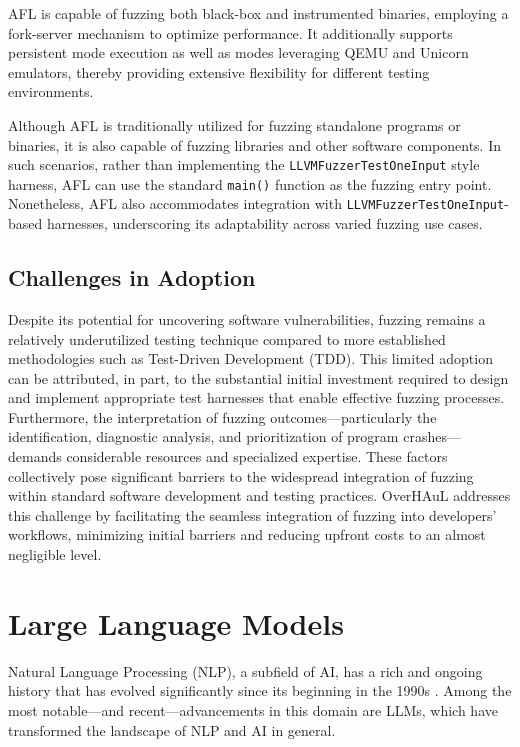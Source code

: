 \documentclass[
  a4paper,
]{scrreprt}
\theoremstyle{definition}
\theoremstyle{remark}
\begin{document}
AFL is capable of fuzzing both black-box and instrumented binaries,
employing a fork-server mechanism to optimize performance. It
additionally supports persistent mode execution as well as modes
leveraging QEMU and Unicorn emulators, thereby providing extensive
flexibility for different testing environments.

Although AFL is traditionally utilized for fuzzing standalone programs
or binaries, it is also capable of fuzzing libraries and other software
components. In such scenarios, rather than implementing the
\texttt{LLVMFuzzerTestOneInput} style harness, AFL can use the standard
\texttt{main()} function as the fuzzing entry point. Nonetheless, AFL
also accommodates integration with \texttt{LLVMFuzzerTestOneInput}-based
harnesses, underscoring its adaptability across varied fuzzing use
cases.

\subsection{Challenges in Adoption}\label{challenges-in-adoption}

Despite its potential for uncovering software vulnerabilities, fuzzing
remains a relatively underutilized testing technique compared to more
established methodologies such as Test-Driven Development (TDD). This
limited adoption can be attributed, in part, to the substantial initial
investment required to design and implement appropriate test harnesses
that enable effective fuzzing processes. Furthermore, the interpretation
of fuzzing outcomes---particularly the identification, diagnostic
analysis, and prioritization of program crashes---demands considerable
resources and specialized expertise. These factors collectively pose
significant barriers to the widespread integration of fuzzing within
standard software development and testing practices. OverHAuL addresses
this challenge by facilitating the seamless integration of fuzzing into
developers' workflows, minimizing initial barriers and reducing upfront
costs to an almost negligible level.

\section{Large Language Models}\label{large-language-models}

Natural Language Processing (NLP), a subfield of AI, has a rich and
ongoing history that has evolved significantly since its beginning in
the 1990s \autocite{li2022,wang2025}. Among the most notable---and
recent---advancements in this domain are LLMs, which have transformed
the landscape of NLP and AI in general.
\end{document}
